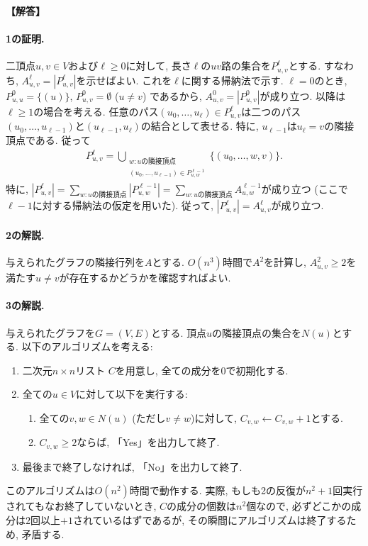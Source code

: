 \documentclass[12pt,a4paper]{article}
\newenvironment{solution}{
    \vspace{0.5em}
    \begin{tcolorbox}[colback=white, colframe=black, boxrule=1pt, arc=0mm, breakable]
    \noindent
    \textbf{【解答】}
    \vspace{0.3em}
}{
    \end{tcolorbox}
    \vspace{1em}
}
\begin{document}
\begin{solution}
\paragraph*{1の証明.}
  二頂点$u,v\in V$および$\ell\ge 0$に対して, 長さ$\ell$の$uv$路の集合を$P^{\ell}_{u,v}$とする. すなわち, $A^\ell_{u,v}=|P^{\ell}_{u,v}|$を示せばよい. これを$\ell$に関する帰納法で示す.
  $\ell=0$のとき, $P^0_{u,u}=\{(u)\}$, $P^0_{u,v}=\emptyset$ ($u\ne v$) であるから, $A^0_{u,v}=|P^0_{u,v}|$が成り立つ. 以降は$\ell\ge 1$の場合を考える.
  任意のパス$(u_0,\dots,u_{\ell})\in P^{\ell}_{u,v}$は二つのパス $(u_0,\dots,u_{\ell-1})$と$(u_{\ell-1},u_{\ell})$の結合として表せる.
  特に, $u_{\ell-1}$は$u_{\ell}=v$の隣接頂点である. 従って
  \begin{align*}
    P^{\ell}_{u,v} = \bigcup_{\substack{w\colon \text{$u$の隣接頂点} \\ (u_0,\dots,u_{\ell-1})\in P^{\ell-1}_{u,w}}} \{ (u_0,\dots,w,v) \}.
  \end{align*}
  特に, $|P^{\ell}_{u,v}| = \sum_{w\colon \text{$u$の隣接頂点}} |P^{\ell-1}_{u,w}| = \sum_{w\colon \text{$u$の隣接頂点}} A^{\ell-1}_{u,w}$が成り立つ (ここで$\ell-1$に対する帰納法の仮定を用いた).
  従って, $|P^\ell_{u,v}|=A^\ell_{u,v}$が成り立つ.

\paragraph*{2の解説.} 与えられたグラフの隣接行列を$A$とする. $O(n^3)$時間で$A^2$を計算し, $A^2_{u,v}\ge 2$を満たす$u\ne v$が存在するかどうかを確認すればよい.

\paragraph*{3の解説.} 与えられたグラフを$G=(V,E)$とする. 頂点$u$の隣接頂点の集合を$N(u)$とする. 以下のアルゴリズムを考える:

\begin{enumerate}
  \item 二次元$n\times n$リスト $C$を用意し, 全ての成分を$0$で初期化する.
  \item 全ての$u\in V$に対して以下を実行する:
  \begin{enumerate}
    \item 全ての$v,w\in N(u)$ (ただし$v\ne w$)に対して, $C_{v,w}\leftarrow C_{v,w}+1$とする.
    \item $C_{v,w}\ge 2$ならば, 「Yes」を出力して終了.
  \end{enumerate}
  \item 最後まで終了しなければ, 「No」を出力して終了.
\end{enumerate} このアルゴリズムは$O(n^2)$時間で動作する. 実際, もしも2の反復が$n^2+1$回実行されてもなお終了していないとき, $C$の成分の個数は$n^2$個なので, 必ずどこかの成分は$2$回以上$+1$されているはずであるが, その瞬間にアルゴリズムは終了するため, 矛盾する.
\end{solution}
\end{document}
